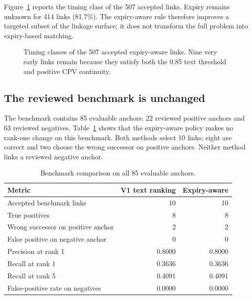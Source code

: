 \documentclass[11pt,a4paper]{article}
\begin{document}
Figure~\ref{fig:timingclasses} reports the timing class of the 507 accepted links.
Expiry remains unknown for 414 links (81.7\%). The expiry-aware rule therefore
improves a targeted subset of the linkage surface; it does not transform the full
problem into expiry-based matching.

\begin{figure}[H]
\centering
{}
\caption{Timing classes of the 507 accepted expiry-aware links. Nine very early
links remain because they satisfy both the 0.85 text threshold and positive CPV
continuity.}
\label{fig:timingclasses}
\end{figure}

\subsection{The reviewed benchmark is unchanged}

The benchmark contains 85 evaluable anchors: 22 reviewed positive anchors and 63
reviewed negatives. Table~\ref{tab:benchmark} shows that the expiry-aware policy
makes no rank-one change on this benchmark. Both methods select 10 links: eight are
correct and two choose the wrong successor on positive anchors. Neither method links
a reviewed negative anchor.

\begin{table}[H]
\centering
\caption{Benchmark comparison on all 85 evaluable anchors.}
\label{tab:benchmark}
\begin{tabular}{lrr}
\toprule
\textbf{Metric} & \textbf{V1 text ranking} & \textbf{Expiry-aware} \\
\midrule
Accepted benchmark links & 10 & 10 \\
True positives & 8 & 8 \\
Wrong successor on positive anchor & 2 & 2 \\
False positive on negative anchor & 0 & 0 \\
Precision at rank 1 & 0.8000 & 0.8000 \\
Recall at rank 1 & 0.3636 & 0.3636 \\
Recall at rank 5 & 0.4091 & 0.4091 \\
False-positive rate on negatives & 0.0000 & 0.0000 \\
\bottomrule
\end{tabular}
\end{table}
\end{document}
